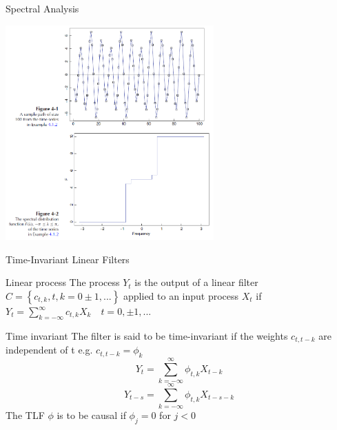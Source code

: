 \documentclass[11pt]{beamer}
\begin{document}
\begin{frame}{Spectral Analysis \cite{brockwell2002introduction}}
    \begin{center}
     \includegraphics[width=0.6\textwidth]{Pic/spectral_distribution.png}
    \end{center}
\end{frame}


\begin{frame}{Time-Invariant Linear Filters \cite{brockwell2002introduction}}
\begin{alertblock}{Linear process}
The process ${Y_{t}}$ is the output of a linear filter $C=\left\lbrace c_{t,k},t,k=0\pm1,...\right\rbrace$  applied to an input process ${X_{t}}$ if $Y_{t}=\sum^{\infty}_{k=-\infty}c_{t,k}X_{k}\quad t=0,\pm 1,...$
\end{alertblock}
\begin{alertblock}{Time invariant}
The filter is said to be time-invariant if the weights $c_{t,t-k}$ are independent of t e.g. $c_{t,t-k}=\phi_{k}$
\begin{equation*}
Y_{t}=\sum^{\infty}_{k=-\infty}\phi_{t,k}X_{t-k}
\end{equation*}
\begin{equation*}
Y_{t-s}=\sum^{\infty}_{k=-\infty}\phi_{t,k}X_{t-s-k}
\end{equation*}
The TLF $\phi$ is to be causal if $\phi_{j}=0$ for $j<0$
\end{alertblock}
\end{frame}
\end{document}
